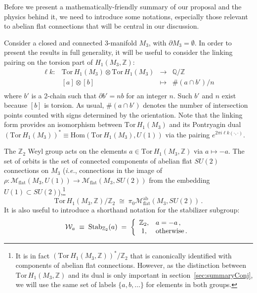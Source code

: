 \documentclass[hyper,letterpaper]{JHEP3}
\newcommand{\Z}{{\mathbb Z}}
\newcommand{\Q}{{\mathbb Q}}
\def\CM{{\mathcal M}}
\def\CW{{\mathcal W}}
\def\ie{{\textit{i.e.}}}
\def\lk{{\ell k}}
\def\Tor{{\mathrm{Tor}\,}}
\begin{document}
Before we present a mathematically-friendly summary of our proposal and the physics behind it, we need to introduce
some notations, especially those relevant to abelian flat connections that will be central in our discussion.

Consider a closed and connected 3-manifold $M_3$, with $\partial M_3=\emptyset$. In order to present the results in full generality, it will be useful to consider the linking pairing on the torsion part of $H_1(M_3,\Z)$:
\begin{equation}
	\begin{array}{cccc}
		\lk: & \Tor H_1(M_3)\otimes \Tor H_1(M_3) & \longrightarrow & \Q/\Z \\
		& [a]\otimes [b] & \longmapsto & {\#(a\cap b')}/{n} \\
	\end{array}
\end{equation}
where $b'$ is a 2-chain such that $\partial b'=nb$ for an integer $n$. Such $b'$ and $n$ exist because $[b]$ is torsion. As usual, $\#(a\cap b')$ denotes the number of intersection points counted with signs determined by the orientation.  Note that the linking form provides an isomorphism between $\Tor H_1(M_3)$ and its Pontryagin dual $(\Tor H_1(M_3))^*\equiv\mathrm{Hom}(\Tor H_1(M_3),U(1))$ via the pairing $e^{2\pi i\lk(\cdot,\cdot)}$.

The $\Z_2$ Weyl group acts on the elements $a\in\Tor H_1(M_3,\Z)$ via $a\mapsto -a$. The set of orbits is the set of connected components of abelian flat $SU(2)$ connections on $M_3$ (\ie, connections in the image of $\rho: \CM_\text{flat}\left(M_3,U(1)\right)\rightarrow \CM_\text{flat}\left(M_3,SU(2)\right)$ from the embedding $U(1)\subset SU(2)$),\footnote{It is in fact $\left(\Tor H_1(M_3,\Z)\right)^*/\Z_2$ that is canonically identified with components of abelian flat connections. However, as the distinction between $\Tor H_1(M_3,\Z)$ and its dual is only important in section~\ref{sec:summaryConj}, we will use the same set of labels $\{a, b, \ldots\}$ for elements in both groups. }
\begin{equation}
	\Tor H_1(M_3,\Z)/\Z_2 \; \cong \; \pi_0\CM_\text{flat}^\text{ab}(M_3,SU(2)) \,.
\end{equation}
 It is also useful to introduce a shorthand notation for the stabilizer subgroup:
\begin{equation}
	\CW_a \; \equiv \; \text{Stab}_{\Z_2}(a) \; = \; \left\{
	\begin{array}{cl}
		\Z_2, & a=-a \,, \\
		1, & \text{otherwise\,.}
	\end{array}
	\right.
\end{equation}
\end{document}
